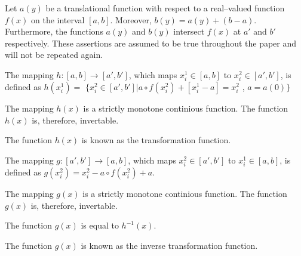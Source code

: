 \documentclass[twoside,reqno,11pt]{fcaa-var} %
\begin{document}
Let $a(y)$ be a translational function with respect to a real--valued function $f(x)$ on the interval $[a,b]$. Moreover, $b(y) = a(y) + (b-a)$. Furthermore, the functions $a(y)$ and $b(y)$ intersect $f(x)$ at $a'$ and $b'$ respectively.
These assertions are assumed to be true throughout the paper and will not be repeated again.

\begin{definition}\label{def:h}
The mapping $h : [a, b] \rightarrow [a',b']$, which maps $x_i^1 \in [a, b]$ to $x_i^2 \in [a',b']$, is defined as
$h(x_i^1) =$ $\{x_i^2 \in [a' ,b'] | a\circ f(x_i^2) + [x_i^1 - a] = x_i^2$ , $a = a(0)\}$
\end{definition}

\begin{theorem}
The mapping $h(x)$ is a strictly monotone continious function. The function $h(x)$ is, therefore, invertable.
\end{theorem}

\noindent
The function $h(x)$ is known as the transformation function. 

\begin{definition}\label{def:g}
The mapping $g:[a', b'] \rightarrow [a, b]$, which maps $x_i^2 \in [a' , b']$ to $x_i^1\in [a, b]$,
is defined as $g(x_i^2) = x_i^2 - a \circ f (x_i^2) + a$.
\end{definition}

\begin{theorem}
The mapping $g(x)$ is a strictly monotone continious function. The function $g(x)$ is, therefore, invertable.
\end{theorem}

\begin{theorem}
\label{t:inv}
The function $g(x)$ is equal to $h^{-1}(x)$.
\end{theorem}

The function $g(x)$ is known as the inverse transformation function.
\end{document}

